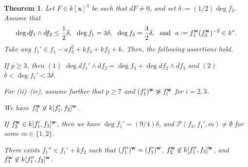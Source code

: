 \documentclass{amsart}
\theoremstyle{plain}
\newtheorem{thm}{Theorem}[section]
\theoremstyle{definition}
\newcommand{\nd}{\noindent}
\newcommand{\x}{{\boldsymbol x}}
\newcommand{\w}{{\bf w}}
\newcommand{\kx}{k[\x]}
\begin{document}
\begin{thm}\label{ex:total}
Let $F\in \kx ^3$ be such that $dF\ne 0$, 
and set $\delta :=(1/2)\deg f_2$. 
Assume that 
\begin{equation}\label{eq:ex:total}
\deg df_1\wedge df_2\le \dfrac{1}{2}\delta ,\ \ 
\deg f_1=3\delta ,\ \ 
\deg f_3=\dfrac{3}{2}\delta ,
\text{ \ and \ }a:=f_1^{\w }(f_3^{\w })^{-2}\in k^*. 
\end{equation}
Take any $f_1'\in f_1-af_3^2+kf_3+kf_2+k$. 
Then, the following assertions hold. 

\nd {\rm (i)} 
If $p\ge 3$, 
then 
$(1)$ $\deg df_1'\wedge df_2=\deg f_3+\deg df_2\wedge df_3$ 
and $(2)$ $\delta <\deg f_1'<3\delta $. 

\smallskip 


\nd For {\rm (ii)--(iv)}, 
assume further that 
$p\ge 7$ and $(f_1')^{\w }\not\approx f_i^{\w }$ for $i=2,3$. 


\nd {\rm (ii)} 
We have $f_3^{\w }\not\in k[f_1',f_2]^{\w }$. 


\nd {\rm (iii)} 
If $f_2^{\w }\in k[f_1',f_3]^{\w }$, 
then we have $\deg f_1'=(9/4)\delta $, 
and $\mathcal{P}(f_3,f_1',m)\ne \emptyset $ for some $m\in \{ 1,2\} $. 


\nd {\rm (iv)} 
There exists $f_1''\in f_1'+kf_2$ 
such that $(f_1'')^{\w }=(f_1')^{\w }$, 
$f_2^{\w }\not\in k[f_1'',f_3]^{\w }$, 
and $f_3^{\w }\not\in k[f_1'',f_2]^{\w }$. 



\end{thm}
\end{document}
